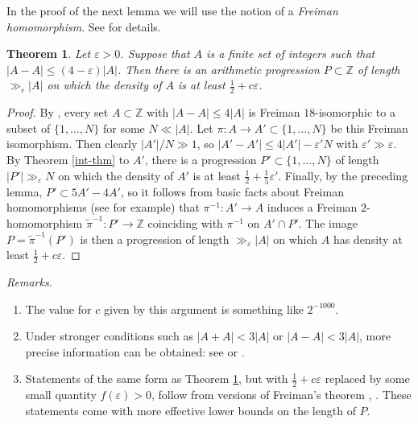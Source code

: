 \documentclass[10pt,reqno]{amsart}
\newtheorem{theorem}{Theorem}[section]
\theoremstyle{definition}
\theoremstyle{remark}
\renewcommand{\leq}{\leqslant}
\def\Z{\mathbb{Z}}
\def\eps{\varepsilon}
\numberwithin{equation}{section}
\begin{document}
In the proof of the next lemma we will use the notion of a \emph{Freiman homomorphism}. See \cite[Definition 5.21]{tv} for details.

\begin{theorem}\label{dub-4-thm}
Let $\eps > 0$. Suppose that $A$ is a finite set of integers such that $|A - A| \leq (4 - \eps)|A|$. Then there is an arithmetic progression $P \subset \Z$ of length $\gg_{\eps} |A|$ on which the density of $A$ is at least $\frac{1}{2} + c\eps$.
\end{theorem}
\begin{proof}
By \cite[Theorem 1.4]{green-ruzsa-rectification}, every set $A \subset \Z$ with $|A - A| \leq 4|A|$ is Freiman $18$-isomorphic to a subset of $\{1,\dots,N\}$ for some $N \ll |A|$. Let $\pi : A \to A' \subset \{1,\dots,N\}$ be this Freiman isomorphism. Then clearly $|A'|/N \gg 1$, so $|A' - A'| \leq 4|A'| - \eps' N$ with $\eps' \gg \eps$. By Theorem \ref{int-thm} to $A'$, there is a progression $P' \subset \{1,\dots,N\}$ of length $|P'| \gg_{\eps} N$ on which the density of $A'$ is at least $\frac{1}{2} + \tfrac{1}{5}\eps'$. Finally, by the preceding lemma, $P' \subset 5A' - 4A'$, so it follows from basic facts about Freiman homomorphisms (see \cite[Section 5.2]{tv} for example) that $\pi^{-1} : A' \to A$ induces a Freiman $2$-homomorphism $\tilde\pi^{-1} : P' \to \Z$ coinciding with $\pi^{-1}$ on $A' \cap P'$. The image $P = \tilde\pi^{-1}(P')$ is then a progression of length $\gg_\eps |A|$ on which $A$ has density at least $\frac{1}{2} + c \eps$.
\end{proof}

\emph{Remarks.} 
\begin{enumerate}
	\item The value for $c$ given by this argument is something like $2^{-1000}$.
	\item Under stronger conditions such as $|A + A| < 3|A|$ or $|A - A| < 3|A|$, more precise information can be obtained: see \cite[Theorem 1.9]{freiman-book} or \cite{lev-smeliansky}.
	\item Statements of the same form as Theorem \ref{dub-4-thm}, but with $\frac{1}{2} + c\eps$ replaced by some small quantity $f(\eps) > 0$, follow from versions of Freiman's theorem \cite[Theorem 2.8]{freiman-book}, \cite[Theorem 1.2]{bilu}. These statements come with more effective lower bounds on the length of $P$.
\end{enumerate}
\end{document}
